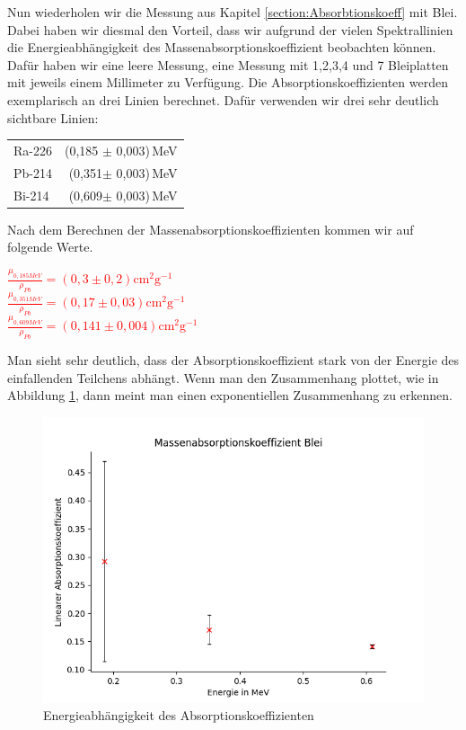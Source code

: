 Nun wiederholen wir die Messung aus Kapitel \ref{section:Absorbtionskoeff} mit Blei. Dabei haben wir diesmal den Vorteil, dass wir aufgrund der vielen 
Spektrallinien die Energieabhängigkeit des Massenabsorptionskoeffizient beobachten können. Dafür haben wir eine leere Messung, eine Messung mit 1,2,3,4 und 7 Bleiplatten mit 
jeweils einem Millimeter zu Verfügung. Die Absorptionskoeffizienten werden exemplarisch an drei Linien berechnet. 
Dafür verwenden wir drei sehr deutlich sichtbare Linien:
\begin{center}
    \centering
    \begin{tabular}{lr}
        Ra-226 & (0,185 $\pm$ 0,003)\,MeV\\
        Pb-214 & (0,351$\pm$ 0,003)\,MeV\\
        Bi-214 & (0,609$\pm$ 0,003)\,MeV\\
    \end{tabular}
\end{center}

Nach dem Berechnen der Massenabsorptionskoeffizienten kommen wir auf folgende Werte.


\begin{center}
    \centering
    \textcolor{red}{$\frac{\mu_{0,185MeV}}{\rho_{Pb}} = (0,3\pm0,2) \mathrm{cm}^{2} \mathrm{g}^{-1}$}\\
    \textcolor{red}{$\frac{\mu_{0,351MeV}}{\rho_{Pb}}= (0,17\pm0,03) \mathrm{cm}^{2} \mathrm{g}^{-1}$}\\
    \textcolor{red}{$\frac{\mu_{0,609MeV}}{\rho_{Pb}}= (0,141\pm0,004) \mathrm{cm}^{2} \mathrm{g}^{-1}$}\\
\end{center}

Man sieht sehr deutlich, dass der Absorptionskoeffizient stark von der Energie des einfallenden Teilchens abhängt. Wenn man den Zusammenhang plottet, wie in Abbildung \ref{AbsEne}, dann meint man 
einen exponentiellen Zusammenhang zu erkennen.

\begin{figure}
    \centering
    \includegraphics[width = 12cm]{Bilder/Auswertung/AbsorbtionBleiEnergie.png}
    \caption{Energieabhängigkeit des Absorptionskoeffizienten}
    \label{AbsEne}
\end{figure}

